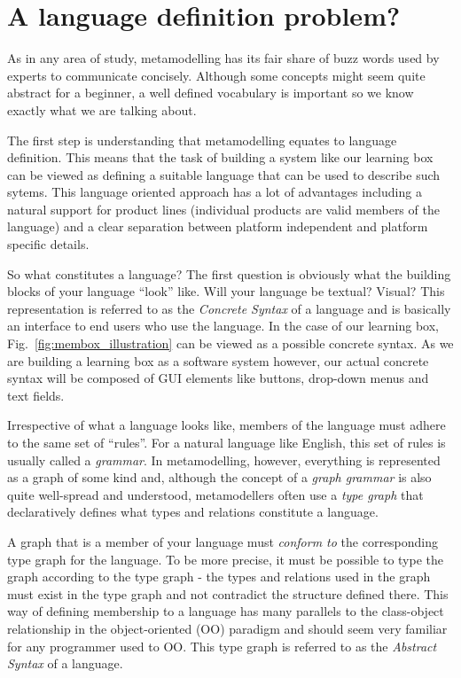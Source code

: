 
\section{A language definition problem?}

As in any area of study, metamodelling has its fair share of buzz words used by experts to communicate concisely.  Although some concepts might seem quite
abstract for a beginner, a well defined vocabulary is important so we know exactly what we are talking about.

The first step is understanding that metamodelling equates to language definition. This means that the task of building a system like our learning box can be  
viewed as defining a suitable language that can be used to describe such sytems. This language oriented approach has a lot of advantages including a natural
support for product lines (individual products are valid members of the language) and a clear separation between platform independent and platform specific details.

So what constitutes a language?  The first question is obviously what the building blocks of your language ``look'' like. Will your language be textual? Visual?
 This representation is referred to as the \emph{Concrete Syntax} of a language and is basically an interface to end users who use the
language. In the case of our learning box, Fig.~\ref{fig:membox_illustration} can be viewed as a possible concrete syntax. As we are building a learning box
as a software system however, our actual concrete syntax will be composed of GUI elements like buttons, drop-down menus and text fields.

Irrespective of what a language looks like, members of the language must adhere to the same set of ``rules''. For a natural language like
English, this set of rules is usually called a \emph{grammar}. In metamodelling, however, everything is represented as a graph of some kind and,
although the concept of a \emph{graph grammar} is also quite well-spread and understood, metamodellers often use a \emph{type
graph} that declaratively defines what types and relations constitute a language.

A graph that is a member of your language must \emph{conform to} the corresponding type graph for the language. To be more precise, it must be possible to type
the graph according to the type graph - the types and relations used in the graph must exist in the type graph and not contradict the structure defined there.
This way of defining membership to a language has many parallels to the class-object relationship in the object-oriented (OO) paradigm and
should seem very familiar for any programmer used to OO. This type graph is referred to as the \emph{Abstract Syntax} of a language.

